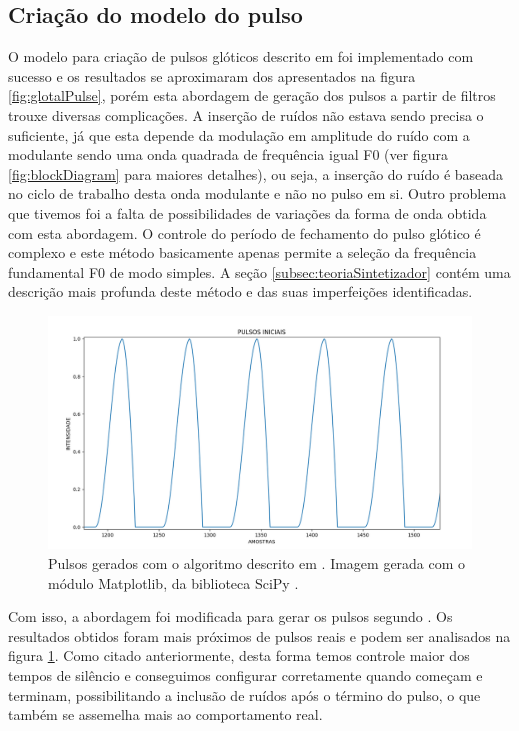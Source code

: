 \documentclass[
  12pt,       
  openright,      
  twoside,      
  a4paper,      
  english,      
  french,       
  spanish,      
  brazil,     
  ]{abntex2}
\begin{document}
\subsection{Criação do modelo do pulso}
O modelo para criação de pulsos glóticos descrito em  foi implementado com sucesso e os resultados se aproximaram dos apresentados na figura \ref{fig:glotalPulse}, porém esta abordagem de geração dos pulsos a partir de filtros trouxe diversas complicações. A inserção de ruídos não estava sendo precisa o suficiente, já que esta depende da modulação em amplitude do ruído com a modulante sendo uma onda quadrada de frequência igual F0 (ver figura \ref{fig:blockDiagram} para maiores detalhes), ou seja, a inserção do ruído é baseada no ciclo de trabalho desta onda modulante e não no pulso em si. Outro problema que tivemos foi a falta de possibilidades de variações da forma de onda obtida com esta abordagem. O controle do período de fechamento do pulso glótico é complexo e este método basicamente apenas permite a seleção da frequência fundamental F0 de modo simples. A seção \ref{subsec:teoriaSintetizador} contém uma descrição mais profunda deste método e das suas imperfeições identificadas.

\begin{figure}
\includegraphics[width=\textwidth,keepaspectratio]{imagens/pulsos_iniciais_sem_variacoes.PNG}
\caption{Pulsos gerados com o algoritmo descrito em . Imagem gerada com o módulo Matplotlib, da biblioteca SciPy \cite{scipy}.}
\label{fig:pulsosSemVariacoes}
\end{figure}

Com isso, a abordagem foi modificada para gerar os pulsos segundo . Os resultados obtidos foram mais próximos de pulsos reais e podem ser analisados na figura \ref{fig:pulsosSemVariacoes}. Como citado anteriormente, desta forma temos controle maior dos tempos de silêncio e conseguimos configurar corretamente quando começam e terminam, possibilitando a inclusão de ruídos após o término do pulso, o que também se assemelha mais ao comportamento real.
\end{document}
